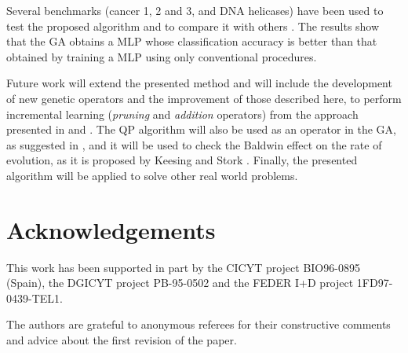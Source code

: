 \documentclass{elsart}
\begin{document}
Several benchmarks (cancer 1, 2 and 3, and DNA helicases) have been used to test the proposed algorithm and to compare it with others \cite{Prechelt94c,heliNPL}. The results show that the GA obtains a MLP whose classification accuracy is better than that obtained by training a MLP using only conventional procedures.

Future work will extend the presented method and will include the development of new genetic operators and the improvement of those described here, to perform incremental learning (\emph{pruning} and \emph{addition} operators) from the approach presented in  \cite{FahlmanCASCOR} and \cite{Pelillo}.
The QP algorithm will also be used as an operator in the GA, as suggested in \cite{Montana}, and it will be used to check the Baldwin effect on the rate of evolution, as it is proposed by Keesing and Stork \cite{Keesing}.
Finally, the presented algorithm will be applied to solve other real world problems.


\section{Acknowledgements}
\label{sec:ackn}
This work has been supported in part by the CICYT project BIO96-0895 (Spain), the DGICYT project PB-95-0502 and the FEDER I+D project 1FD97-0439-TEL1.

The authors are grateful to anonymous referees for their constructive comments and advice about the first revision of the paper.




\end{document}

